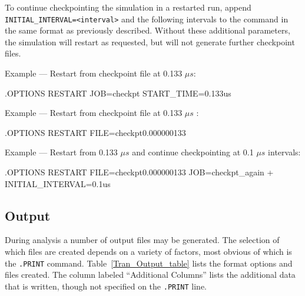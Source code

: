 To continue checkpointing the simulation in a restarted run, append
\texttt{INITIAL\_INTERVAL=<interval>} and the following intervals to
the command in the same format as previously described.  Without these
additional parameters, the simulation will restart as requested, but
will not generate further checkpoint files.

\begin{XyceItemize}
\item Example --- Restart from checkpoint file at 0.133
  $\mu s$:
\begin{vquote}
.OPTIONS RESTART JOB=checkpt START_TIME=0.133us
\end{vquote}
\item Example --- Restart from checkpoint file at 0.133 $\mu s$ :
\begin{vquote}
.OPTIONS RESTART FILE=checkpt0.000000133
\end{vquote}
\item Example --- Restart from 0.133 $\mu s$ and continue checkpointing at 0.1
      $\mu s$ intervals:
\begin{vquote}
.OPTIONS RESTART FILE=checkpt0.000000133 JOB=checkpt_again
+ INITIAL_INTERVAL=0.1us
\end{vquote}
\end{XyceItemize}
\subsection{Output}
\label{Transient_Output}

During analysis a number of output files may be generated.  The
selection of which files are created depends on a variety of factors,
most obvious of which is the \texttt{.PRINT} command.
Table~\ref{Tran_Output_table} lists the format options and files
created.  The column labeled ``Additional Columns'' lists the additional
data that is written, though not specified on the \texttt{.PRINT} line.

